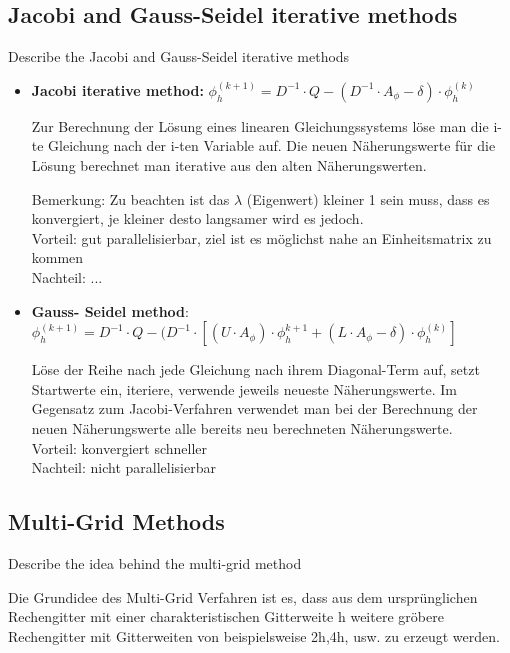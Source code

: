 \documentclass[a4paper]{scrartcl}
\begin{document}
\subsection{Jacobi and Gauss-Seidel iterative methods}
Describe the Jacobi and Gauss-Seidel iterative methods
\begin{itemize}
\item \textbf{Jacobi iterative method:}  $ \phi ^{(k+1)}_h = D^{-1} \cdot Q -
(D^{-1} \cdot A_\phi - \delta)\cdot \phi_h^{(k)}$

Zur Berechnung der Lösung eines linearen Gleichungssystems löse man die i-te
Gleichung nach der i-ten Variable auf. Die neuen Näherungswerte für die Lösung
berechnet man iterative aus den alten Näherungswerten.

Bemerkung: Zu beachten ist das $\lambda$ (Eigenwert) kleiner 1 sein muss, dass
es konvergiert, je kleiner desto langsamer wird es jedoch.\\
Vorteil: gut parallelisierbar, ziel ist es möglichst nahe an Einheitsmatrix zu
kommen\\
Nachteil: ...\\


\item \textbf{Gauss- Seidel method}: $ \phi ^{(k+1)}_h = D^{-1} \cdot Q -
(D^{-1} \cdot [(U\cdot A_\phi ) \cdot \phi_h^{k+1} + (L \cdot A_\phi -
\delta)\cdot \phi_h^{(k)}]$

Löse der Reihe nach jede Gleichung nach ihrem Diagonal-Term auf, setzt
Startwerte ein, iteriere, verwende jeweils neueste Näherungswerte. Im Gegensatz
zum Jacobi-Verfahren verwendet man bei der Berechnung der neuen Näherungswerte
alle bereits neu berechneten Näherungswerte.\\

Vorteil: konvergiert schneller\\
Nachteil: nicht parallelisierbar\\

\end{itemize} 

\subsection{Multi-Grid Methods} 
Describe the idea behind the multi-grid method

Die Grundidee des Multi-Grid Verfahren ist es, dass aus dem ursprünglichen
Rechengitter mit einer charakteristischen Gitterweite h weitere gröbere
Rechengitter mit Gitterweiten von beispielsweise 2h,4h, usw. zu erzeugt werden.
\\
\end{document}
